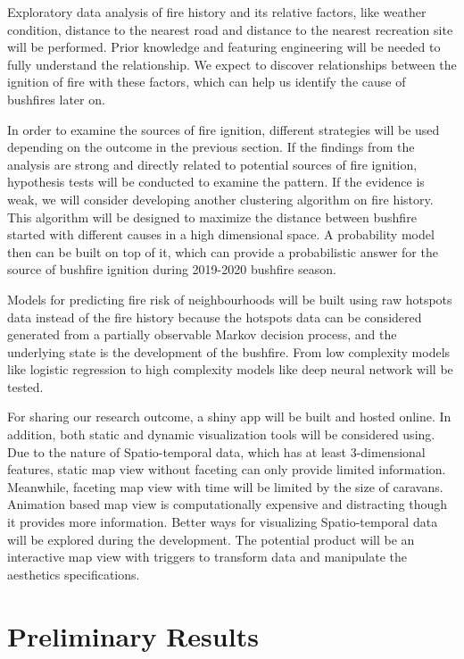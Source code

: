 \documentclass{monashthesis}
\begin{document}
Exploratory data analysis of fire history and its relative factors, like
weather condition, distance to the nearest road and distance to the
nearest recreation site will be performed. Prior knowledge and featuring
engineering will be needed to fully understand the relationship. We
expect to discover relationships between the ignition of fire with these
factors, which can help us identify the cause of bushfires later on.

In order to examine the sources of fire ignition, different strategies
will be used depending on the outcome in the previous section. If the
findings from the analysis are strong and directly related to potential
sources of fire ignition, hypothesis tests will be conducted to examine
the pattern. If the evidence is weak, we will consider developing
another clustering algorithm on fire history. This algorithm will be
designed to maximize the distance between bushfire started with
different causes in a high dimensional space. A probability model then
can be built on top of it, which can provide a probabilistic answer for
the source of bushfire ignition during 2019-2020 bushfire season.

Models for predicting fire risk of neighbourhoods will be built using
raw hotspots data instead of the fire history because the hotspots data
can be considered generated from a partially observable Markov decision
process, and the underlying state is the development of the bushfire.
From low complexity models like logistic regression to high complexity
models like deep neural network will be tested.

For sharing our research outcome, a shiny app will be built and hosted
online. In addition, both static and dynamic visualization tools will be
considered using. Due to the nature of Spatio-temporal data, which has
at least 3-dimensional features, static map view without faceting can
only provide limited information. Meanwhile, faceting map view with time
will be limited by the size of caravans. Animation based map view is
computationally expensive and distracting though it provides more
information. Better ways for visualizing Spatio-temporal data will be
explored during the development. The potential product will be an
interactive map view with triggers to transform data and manipulate the
aesthetics specifications.

\section{Preliminary Results}\label{preliminary-results}
\end{document}
